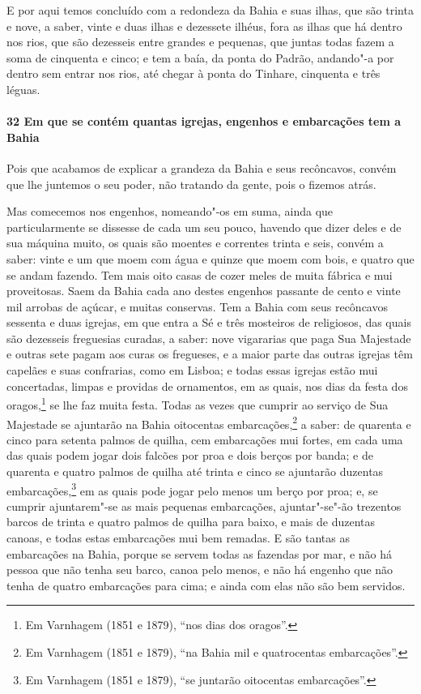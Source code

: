 \begin{linenumbers}
E por aqui temos concluído com a redondeza da Bahia e suas ilhas, que são trinta e nove, a
saber, vinte e duas ilhas e dezessete ilhéus, fora as ilhas que há dentro nos rios, que
são dezesseis entre grandes e pequenas, que juntas todas fazem a soma de cinquenta e
cinco; e tem a baía, da ponta do Padrão, andando"-a por dentro sem entrar nos rios, até
chegar à ponta do Tinhare, cinquenta e três léguas.

\paragraph{32 Em que se contém quantas igrejas, engenhos e embarcações tem a Bahia}\quad
Pois que acabamos de explicar a grandeza da Bahia e seus recôncavos, convém que lhe
juntemos o seu poder, não tratando da gente, pois o fizemos atrás.

Mas comecemos nos engenhos, nomeando"-os em suma, ainda que particularmente se dissesse de
cada um seu pouco, havendo que dizer deles e de sua máquina muito, os quais são moentes e
correntes trinta e seis, convém a saber: vinte e um que moem com água e quinze que moem
com bois, e quatro que se andam fazendo. Tem mais oito casas de cozer meles de muita
fábrica e mui proveitosas. Saem da Bahia cada ano destes engenhos passante de cento e
vinte mil arrobas de açúcar, e muitas conservas. Tem a Bahia com seus recôncavos sessenta
e duas igrejas, em que entra a Sé e três mosteiros de religiosos, das quais são dezesseis
freguesias curadas, a saber: nove vigararias que paga Sua Majestade e outras sete pagam
aos curas os fregueses, e a maior parte das outras igrejas têm capelães e suas confrarias,
como em Lisboa; e todas essas igrejas estão mui concertadas, limpas e providas de
ornamentos, em as quais, nos dias da festa dos oragos,\footnote{ Em Varnhagem (1851 e
1879), ``nos dias dos oragos''.} se lhe faz muita
festa. Todas as vezes que cumprir ao serviço de Sua Majestade se ajuntarão na Bahia
oitocentas embarcações,\footnote{ Em Varnhagem (1851 e 1879), ``na Bahia mil e
quatrocentas embarcações''.} a saber: de quarenta e cinco para setenta palmos de quilha,
cem embarcações mui fortes, em cada uma das quais podem jogar dois falcões por proa e dois
berços por banda; e de quarenta e quatro palmos de quilha até trinta e cinco se ajuntarão
duzentas embarcações,\footnote{ Em Varnhagem (1851 e 1879), ``se juntarão oitocentas
embarcações''.} em as quais pode jogar pelo menos um berço por proa; e, se cumprir
ajuntarem"-se as mais pequenas embarcações, ajuntar"-se"-ão trezentos barcos de trinta e
quatro palmos de quilha para baixo, e mais de duzentas canoas, e todas estas embarcações
mui bem remadas. E são tantas as embarcações na Bahia, porque se servem todas as fazendas
por mar, e não há pessoa que não tenha seu barco, canoa pelo menos, e não há engenho que
não tenha de quatro embarcações para cima; e ainda com elas não são bem servidos.


\end{linenumbers}

